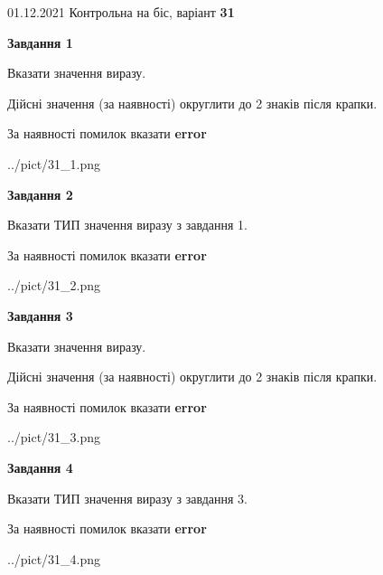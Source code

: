 \documentclass[11pt, ukrainian]{article}
\begin{document}
{01.12.2021 Контрольна на біс, варіант  \No \textbf { 31 }\par}
{
\begin {large}
{\begin {center}\textbf{Завдання 1}\end {center}}\par
Вказати значення виразу. \par
Дійсні значення (за наявності) округлити до 2 знаків після крапки. \par
За наявності помилок вказати \textbf{error}

\begin{center}
	{../pict/31_1.png}
\end{center}
\newpage

{\begin {center}\textbf{Завдання 2}\end {center}}\par
Вказати ТИП значення виразу з завдання 1. \par
За наявності помилок вказати \textbf{error}

\begin{center}
	{../pict/31_2.png}
\end{center}
\newpage

{\begin {center}\textbf{Завдання 3}\end {center}}\par
Вказати значення виразу. \par
Дійсні значення (за наявності) округлити до 2 знаків після крапки. \par
За наявності помилок вказати \textbf{error}

\begin{center}
	{../pict/31_3.png}
\end{center}
\newpage

{\begin {center}\textbf{Завдання 4}\end {center}}\par
Вказати ТИП значення виразу з завдання 3. \par
За наявності помилок вказати \textbf{error}

\begin{center}
	{../pict/31_4.png}
\end{center}
\newpage


\end{large}}
\end{document}
